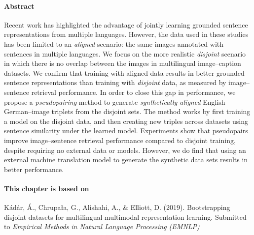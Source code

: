 \paragraph{Abstract}
  Recent work has highlighted the advantage of jointly learning grounded sentence representations 
from multiple languages. 
However, the data used in these studies has 
been limited to an \emph{aligned} scenario:
the same images annotated with sentences 
in multiple languages. We focus on the more realistic 
\emph{disjoint} scenario in which there is no overlap between the images in multilingual image--caption datasets.
We confirm that training with aligned data results in better grounded sentence representations than training with \emph{disjoint} data, as measured by image--sentence retrieval performance.
In order to close this gap in performance, we propose a
\emph{pseudopairing} method to generate \emph{synthetically aligned} 
English--German--image triplets from the disjoint sets. The method works by
first training a model on the 
disjoint data, and then creating new triples across datasets using sentence similarity 
under the learned model.
Experiments show that pseudopairs improve
image--sentence retrieval performance compared to disjoint training, 
despite requiring no external data or models. 
However, we do find that using an external machine translation model 
to generate the synthetic data sets results in better performance.

\newpage

\paragraph{This chapter is based on} Kádár, Á., Chrupała, G., Alishahi, A., \& Elliott, D. (2019).
Bootstrapping disjoint datasets for multilingual multimodal representation learning. 
Submitted to \textit{Empirical Methods in Natural Language Processing (EMNLP)}
\newpage













%
%
